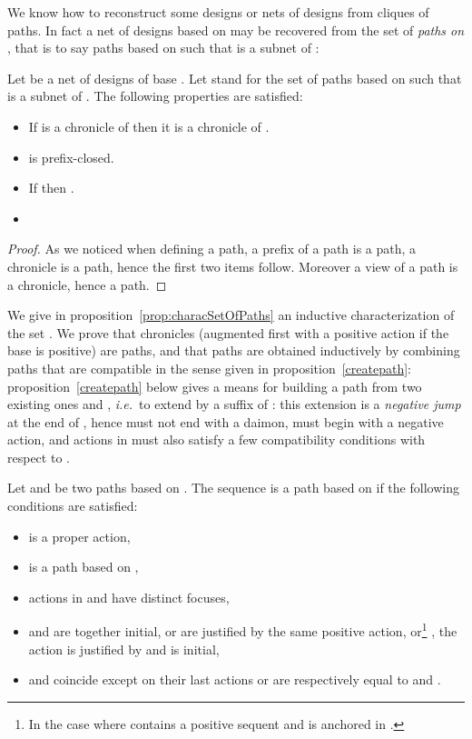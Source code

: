 \documentclass{LMCS}
\def\ie{{\em i.e.}}
\begin{document}
 
We know how to reconstruct some designs or nets of designs from cliques of paths. In fact a net of designs  based on  may be recovered from the set of {\em paths on }, that is to say paths  based on  such that  is a subnet of :

\begin{prop}\label{prop:PathsNet}
 Let  be a net of designs of base . Let
  stand for the set of paths  based on
  such that  is a subnet of
 . The following properties are satisfied:
\begin{itemize}[label=]
\item If  is a chronicle of  then it is a chronicle of .
\item  is prefix-closed.
\item If  then .
\item 
\end{itemize}
\end{prop}
\begin{proof}
As we noticed when defining a path, a prefix of a path is a path, a chronicle is a path, hence the first two items follow. Moreover a view of a path is a chronicle, hence a path.  
\end{proof}


We give in proposition~\ref{prop:characSetOfPaths} an inductive characterization of the set . 
 We prove that chronicles (augmented first with a positive action if the base is positive) are paths, and that paths are obtained inductively by combining paths that are compatible in the sense given in proposition~\ref{createpath}:
  proposition~\ref{createpath} below gives a means for building a path  from two existing ones  and ,
\ie\ to extend  by a suffix of : this extension is a {\em negative jump} at the end of , hence  must not end with a daimon,  must begin with a negative action, and actions in  must also satisfy a few compatibility conditions with respect to .
\begin{prop}\label{createpath}
Let  and  be two paths based on .
The sequence  is
a path based on  if the following conditions are satisfied:
\begin{itemize}[label=]
\item  is a proper action,
\item  is a path based on ,
\item actions in  and   have distinct focuses,
\item  and  are together initial, or are justified by the same positive action, or\footnote{In the case where  contains a positive sequent  and  is anchored in .} , the action  is justified by  and  is initial, 
\item  and  coincide
  except on their last actions or are respectively equal to
   and . 
\end{itemize}
\end{prop}
\end{document}
